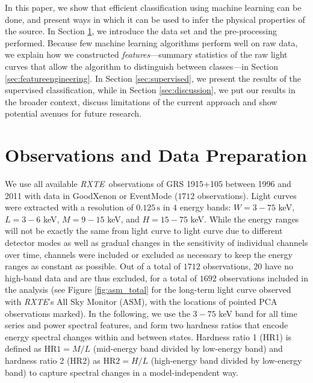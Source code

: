 \documentclass[12pt]{emulateapj}
\newcommand{\project}[1]{\textsl{#1}}
\newcommand{\rxte}{\project{RXTE}}
\begin{document}
In this paper, we show that efficient classification using machine learning can be done, and present ways in which it can be used to infer the physical properties of the source. In Section \ref{sec:observations}, we introduce the data set and the pre-processing performed. Because few machine learning algorithms perform well on raw data, we explain how we constructed \textit{features}---summary statistics of the raw light curves that allow the algorithm to distinguish between classes---in Section \ref{sec:featureengineering}. In Section \ref{sec:supervised}, we present the results of the supervised classification, while in Section \ref{sec:discussion}, we put our 
results in the broader context, discuss limitations of the current approach and show potential avenues for future research.

\section{Observations and Data Preparation}
\label{sec:observations}

We use all available \rxte\ observations of GRS 1915+105 between 1996 and 2011 with data in GoodXenon or EventMode ($1712$ observations). Light curves were extracted with a resolution of $0.125\,\mathrm{s}$ in $4$ energy bands: $W = 3 - 75$ keV, $L = 3 - 6$ keV, $M = 9 - 15$ keV, and $H = 15 - 75$ keV. While the energy ranges will not be exactly the same from light curve to light curve due to different detector modes as well as gradual changes in the sensitivity of individual channels over time, channels were included or excluded as necessary to keep the energy ranges as constant as possible. Out of a total of $1712$ observations, $20$ have no high-band data and are thus excluded, for a total of $1692$ observations included in the analysis (see Figure \ref{fig:asm_total} for the long-term light curve observed with \rxte's All Sky Monitor (ASM), with the locations of pointed PCA observations marked). 
In the following, we use the $3 - 75$ keV band for all time series and power spectral features, and form two hardness ratios that encode energy spectral changes within and between states. Hardness ratio 1 (HR1) is defined as $\mathrm{HR}1 = M/L$ (mid-energy band divided by low-energy band) and hardness ratio 2 (HR2) as $\mathrm{HR}2 = H/L$ (high-energy band divided by low-energy band) to capture spectral changes in a model-independent way.

\end{document}

